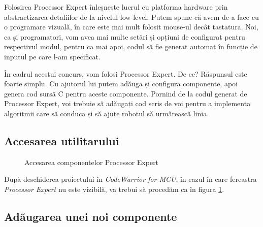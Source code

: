 Folosirea Processor Expert înleșneste lucrul cu platforma hardware prin abstractizarea detaliilor de la nivelul low-level. Putem spune că avem de-a face cu o programare vizuală, în care este mai mult folosit mouse-ul decât tastatura. Noi, ca și programatori, vom avea mai multe setări și opțiuni de configurat pentru respectivul modul, pentru ca mai apoi, codul să fie generat automat în funcție de inputul pe care l-am specificat. 

În cadrul acestui concurs, vom folosi Processor Expert. De ce? Răspunsul este foarte simplu. Cu ajutorul lui putem adăuga și configura componente, apoi genera cod sursă C pentru aceste componente. Pornind de la codul generat de Processor Expert, voi trebuie să adăugați cod scris de voi pentru a implementa algoritmii care să conduca și să ajute robotul să urmărească linia.

\subsection{Accesarea utilitarului}

\begin{figure}
    \vspace{-60pt}
    \vspace{-25pt}
    \caption{\label{fig:CodeWarrior-ProcessorExpert} Accesarea componentelor Processor Expert}
    \vspace{-50pt}
\end{figure}

După deschiderea proiectului în \textit{CodeWarrior for MCU}, în cazul în care fereastra \textit{Processor Expert} nu este vizibilă, va trebui să procedăm ca în figura \ref{fig:CodeWarrior-ProcessorExpert}.

\subsection{Adăugarea unei noi componente}

